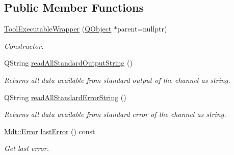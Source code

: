 \subsection*{Public Member Functions}
\begin{DoxyCompactItemize}
\item 
\hyperlink{class_mdt_1_1_deploy_utils_1_1_tool_executable_wrapper_a185d5724b1615df610d30e35070cb414}{Tool\+Executable\+Wrapper} (\hyperlink{class_q_object}{Q\+Object} $\ast$parent=nullptr)
\begin{DoxyCompactList}\small\item\em Constructor. \end{DoxyCompactList}\item 
Q\+String \hyperlink{class_mdt_1_1_deploy_utils_1_1_tool_executable_wrapper_a16c605f652c0ce1df320abc514baa285}{read\+All\+Standard\+Output\+String} ()
\begin{DoxyCompactList}\small\item\em Returns all data available from standard output of the channel as string. \end{DoxyCompactList}\item 
Q\+String \hyperlink{class_mdt_1_1_deploy_utils_1_1_tool_executable_wrapper_a4642cfbc69f58af32dc69b4c4619c002}{read\+All\+Standard\+Error\+String} ()
\begin{DoxyCompactList}\small\item\em Returns all data available from standard error of the channel as string. \end{DoxyCompactList}\item 
\hyperlink{class_mdt_1_1_error}{Mdt\+::\+Error} \hyperlink{class_mdt_1_1_deploy_utils_1_1_tool_executable_wrapper_a9289a5137a237600e869e077b97259a8}{last\+Error} () const 
\begin{DoxyCompactList}\small\item\em Get last error. \end{DoxyCompactList}\end{DoxyCompactItemize}
